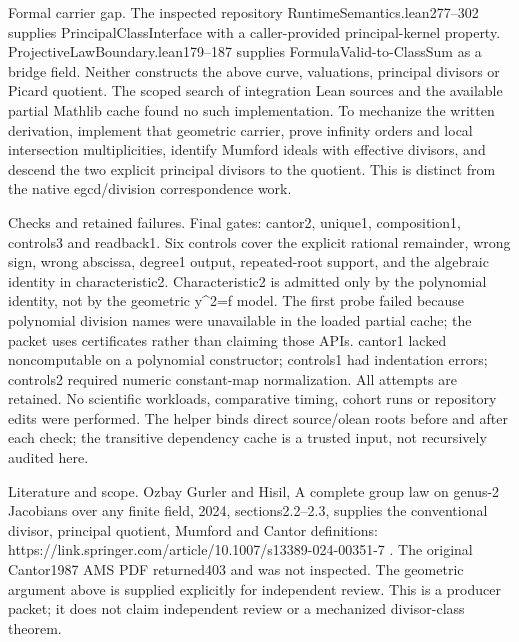 \documentclass[10pt]{article}
\begin{document}
Formal carrier gap. The inspected repository RuntimeSemantics.lean277--302 supplies PrincipalClassInterface with a caller-provided principal-kernel property. ProjectiveLawBoundary.lean179--187 supplies FormulaValid-to-ClassSum as a bridge field. Neither constructs the above curve, valuations, principal divisors or Picard quotient. The scoped search of integration Lean sources and the available partial Mathlib cache found no such implementation. To mechanize the written derivation, implement that geometric carrier, prove infinity orders and local intersection multiplicities, identify Mumford ideals with effective divisors, and descend the two explicit principal divisors to the quotient. This is distinct from the native egcd/division correspondence work.\par\medskip
Checks and retained failures. Final gates: cantor2, unique1, composition1, controls3 and readback1. Six controls cover the explicit rational remainder, wrong sign, wrong abscissa, degree1 output, repeated-root support, and the algebraic identity in characteristic2. Characteristic2 is admitted only by the polynomial identity, not by the geometric y\textasciicircum{}2=f model. The first probe failed because polynomial division names were unavailable in the loaded partial cache; the packet uses certificates rather than claiming those APIs. cantor1 lacked noncomputable on a polynomial constructor; controls1 had indentation errors; controls2 required numeric constant-map normalization. All attempts are retained. No scientific workloads, comparative timing, cohort runs or repository edits were performed. The helper binds direct source/olean roots before and after each check; the transitive dependency cache is a trusted input, not recursively audited here.\par\medskip
Literature and scope. Ozbay Gurler and Hisil, A complete group law on genus-2 Jacobians over any finite field, 2024, sections2.2--2.3, supplies the conventional divisor, principal quotient, Mumford and Cantor definitions: https://link.springer.com/article/10.1007/s13389-024-00351-7 . The original Cantor1987 AMS PDF returned403 and was not inspected. The geometric argument above is supplied explicitly for independent review. This is a producer packet; it does not claim independent review or a mechanized divisor-class theorem.\par\medskip
\end{document}
